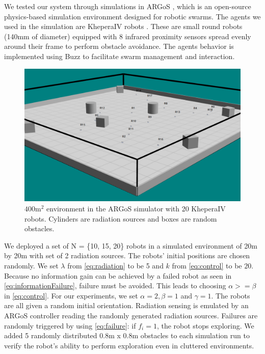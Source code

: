 \documentclass[letterpaper, 10 pt, conference]{ieeeconf}
\begin{document}
We tested our system through simulations in ARGoS
\cite{Pinciroli:SI2012}, which is an open-source physics-based
simulation environment designed for robotic swarms. The agents we used
in the simulation are KheperaIV robots
\cite{kteam2021kheperaiv}. These are small round robots (140mm of
diameter) equipped with 8 infrared proximity sensors spread evenly
around their frame to perform obstacle avoidance. The
agents behavior is implemented using Buzz to facilitate swarm
management and interaction.

\begin{figure}[h]
	\centering
    \includegraphics[width=0.95\columnwidth]{images/argos.png}
    \caption{$400 \text{m}^2$ environment in the ARGoS simulator with 20 KheperaIV robots. Cylinders are radiation sources and boxes are random obstacles.}
    \label{argos}
\end{figure}

We deployed a set of N = \{10, 15, 20\} robots in a simulated
environment of 20m by 20m with set of 2 radiation sources. The robots'
initial positions are chosen randomly. We set $\lambda$ from
\eqref{eq:radiation} to be 5 and $k$ from \eqref{eq:control} to be
$20$. Because no information gain can be achieved by a failed robot as
seen in \eqref{eq:informationFailure}, failure must be avoided. This
leads to choosing $\alpha >= \beta$ in \eqref{eq:control}. For our
experiments, we set $\alpha=2, \beta=1$ and $\gamma=1$. The robots are
all given a random initial orientation. Radiation sensing is emulated
by an ARGoS controller reading the randomly generated radiation
sources. Failures are randomly triggered by using \eqref{eq:failure}:
if $f_i=1$, the robot stops exploring. We added 5 randomly distributed
0.8m x 0.8m obstacles to each simulation run to verify the robot's ability to
perform exploration even in cluttered environments.
\end{document}
